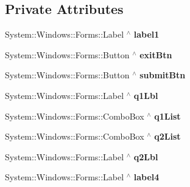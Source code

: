 \subsection*{Private Attributes}
\begin{DoxyCompactItemize}
\item 
\mbox{\label{class_gaze_track_g_u_i_1_1_feedback_adf7b95399622b5e4577430e518b22d87}} 
System\+::\+Windows\+::\+Forms\+::\+Label $^\wedge$ {\bfseries label1}
\item 
\mbox{\label{class_gaze_track_g_u_i_1_1_feedback_aafab7eebaf1702df586b4988ab779318}} 
System\+::\+Windows\+::\+Forms\+::\+Button $^\wedge$ {\bfseries exit\+Btn}
\item 
\mbox{\label{class_gaze_track_g_u_i_1_1_feedback_ae2dafe117d9b3c00c8006c9e6682d7cf}} 
System\+::\+Windows\+::\+Forms\+::\+Button $^\wedge$ {\bfseries submit\+Btn}
\item 
\mbox{\label{class_gaze_track_g_u_i_1_1_feedback_af949e1b5319f2526d7e02e79e3315d59}} 
System\+::\+Windows\+::\+Forms\+::\+Label $^\wedge$ {\bfseries q1\+Lbl}
\item 
\mbox{\label{class_gaze_track_g_u_i_1_1_feedback_ad7f462065808ff12c29df3010bab0ba1}} 
System\+::\+Windows\+::\+Forms\+::\+Combo\+Box $^\wedge$ {\bfseries q1\+List}
\item 
\mbox{\label{class_gaze_track_g_u_i_1_1_feedback_a6730740bc9b30bde05d03d0ed891abeb}} 
System\+::\+Windows\+::\+Forms\+::\+Combo\+Box $^\wedge$ {\bfseries q2\+List}
\item 
\mbox{\label{class_gaze_track_g_u_i_1_1_feedback_af48b9f86110cf82505fe927fcbe409b0}} 
System\+::\+Windows\+::\+Forms\+::\+Label $^\wedge$ {\bfseries q2\+Lbl}
\item 
\mbox{\label{class_gaze_track_g_u_i_1_1_feedback_a99c9d629ca63fdae554e280100b65826}} 
System\+::\+Windows\+::\+Forms\+::\+Label $^\wedge$ {\bfseries label4}
\item 

\end{DoxyCompactItemize}
